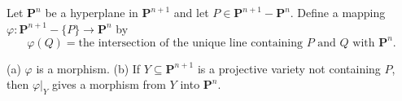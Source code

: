 Let $\mathbf{P}^n$ be a hyperplane in $\mathbf{P}^{n+1}$ and let $P \in \mathbf{P}^{n+1} - \mathbf{P}^n$. Define a mapping $\varphi: \mathbf{P}^{n+1} - \{P\} \to \mathbf{P}^n$ by
$$\varphi(Q) = \text{the intersection of the unique line containing } P \text{ and } Q \text{ with } \mathbf{P}^n.$$

(a) $\varphi$ is a morphism.
(b) If $Y \subseteq \mathbf{P}^{n+1}$ is a projective variety not containing $P$, then $\varphi|_Y$ gives a morphism from $Y$ into $\mathbf{P}^n$.
